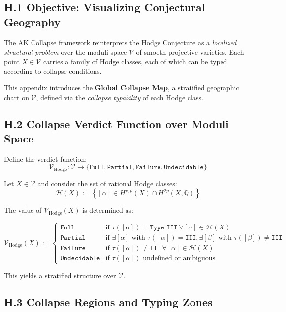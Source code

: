 \documentclass[11pt]{article}
\begin{document}
\subsection*{H.1 Objective: Visualizing Conjectural Geography}

The AK Collapse framework reinterprets the Hodge Conjecture as a \emph{localized structural problem} over the moduli space $\mathcal{V}$ of smooth projective varieties. Each point $X \in \mathcal{V}$ carries a family of Hodge classes, each of which can be typed according to collapse conditions.

This appendix introduces the \textbf{Global Collapse Map}, a stratified geographic chart on $\mathcal{V}$, defined via the \emph{collapse typability} of each Hodge class.

\subsection*{H.2 Collapse Verdict Function over Moduli Space}

Define the verdict function:
\[
\mathcal{V}_{\text{Hodge}} : \mathcal{V} \longrightarrow \{ \texttt{Full}, \texttt{Partial}, \texttt{Failure}, \texttt{Undecidable} \}
\]

Let $X \in \mathcal{V}$ and consider the set of rational Hodge classes:
\[
\mathcal{H}(X) := \left\{ [\alpha] \in H^{p,p}(X) \cap H^{2p}(X, \mathbb{Q}) \right\}
\]

The value of $\mathcal{V}_{\text{Hodge}}(X)$ is determined as:

\[
\mathcal{V}_{\text{Hodge}}(X) :=
\begin{cases}
\texttt{Full} & \text{if } \tau([\alpha]) = \texttt{Type III} \ \forall [\alpha] \in \mathcal{H}(X) \\
\texttt{Partial} & \text{if } \exists [\alpha] \text{ with } \tau([\alpha]) = \texttt{III}, \exists [\beta] \text{ with } \tau([\beta]) \ne \texttt{III} \\
\texttt{Failure} & \text{if } \tau([\alpha]) \ne \texttt{III} \ \forall [\alpha] \in \mathcal{H}(X) \\
\texttt{Undecidable} & \text{if } \tau([\alpha]) \text{ undefined or ambiguous}
\end{cases}
\]

This yields a stratified structure over $\mathcal{V}$.

\subsection*{H.3 Collapse Regions and Typing Zones}
\end{document}
